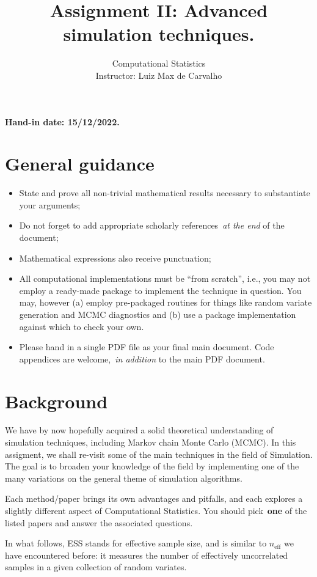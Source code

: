 \documentclass[a4paper,10pt, notitlepage]{report}
\title{Assignment II: Advanced simulation techniques.}
\author{Computational Statistics \\ Instructor: Luiz Max de Carvalho}
\begin{document}
\maketitle

\textbf{Hand-in date: 15/12/2022.}

\section*{General guidance}
\begin{itemize}
 \item State and prove all non-trivial mathematical results necessary to substantiate your arguments;
 \item Do not forget to add appropriate scholarly references~\textit{at the end} of the document;
 \item Mathematical expressions also receive punctuation;
 \item All computational implementations must be ``from scratch'', i.e., you may not employ a ready-made package to implement the technique in question. 
 You may, however (a) employ pre-packaged routines for things like random variate generation and MCMC diagnostics and (b) use a package implementation against which to check your own.
 \item Please hand in a single PDF file as your final main document.
 Code appendices are welcome,~\textit{in addition} to the main PDF document.
 \end{itemize}


\section*{Background}

We have by now hopefully acquired a solid theoretical understanding of simulation techniques, including Markov chain Monte Carlo (MCMC).
In this assigment, we shall re-visit some of the main techniques in the field of Simulation.
The goal is to broaden your knowledge of the field by implementing one of the many variations on the general theme of simulation algorithms.

Each method/paper brings its own advantages and pitfalls, and each explores a slightly different aspect of Computational Statistics.
You should pick~\textbf{one} of the listed papers and answer the associated questions.

In what follows, ESS stands for effective sample size, and is similar to $n_{\text{eff}}$ we have encountered before: it measures the number of effectively uncorrelated samples in a given collection of random variates.
\end{document}
